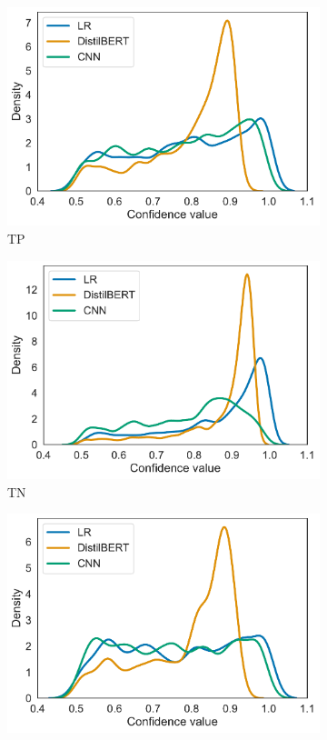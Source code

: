\begin{figure}[t]
    \centering
    \begin{subfigure}{.49\textwidth}
        \includegraphics[scale=.4]{Figures/confidence-densities-unseen-tp.pdf}
        \caption{TP}
    \end{subfigure}
    \begin{subfigure}{.49\textwidth}
        \includegraphics[scale=.4]{Figures/confidence-densities-unseen-tn.pdf}
        \caption{TN}
    \end{subfigure}
    \begin{subfigure}{.49\textwidth}
        \includegraphics[scale=.4]{Figures/confidence-densities-unseen-fp.pdf}

\end{subfigure}
\end{figure}
